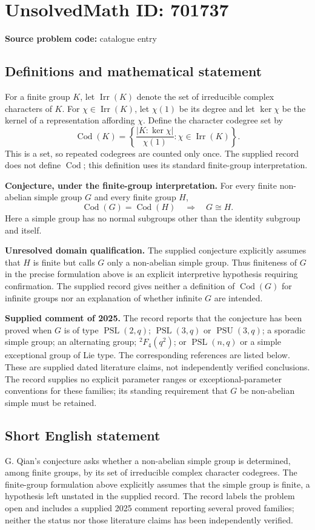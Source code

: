 \documentclass[11pt]{article}
\begin{document}
\section*{UnsolvedMath ID: 701737}
\textbf{Source problem code:} catalogue entry
\subsection{Definitions and mathematical statement}
For a finite group \(K\), let \(\operatorname{Irr}(K)\) denote the set of irreducible complex characters of \(K\). For \(\chi\in\operatorname{Irr}(K)\), let \(\chi(1)\) be its degree and let \(\ker\chi\) be the kernel of a representation affording \(\chi\). Define the character codegree set by
\[
\operatorname{Cod}(K)=\left\{\frac{|K:\ker\chi|}{\chi(1)}:\chi\in\operatorname{Irr}(K)\right\}.
\]
This is a set, so repeated codegrees are counted only once. The supplied record does not define \(\operatorname{Cod}\); this definition uses its standard finite-group interpretation.

\textbf{Conjecture, under the finite-group interpretation.} For every finite non-abelian simple group \(G\) and every finite group \(H\),
\[
\operatorname{Cod}(G)=\operatorname{Cod}(H)\quad\Longrightarrow\quad G\cong H.
\]
Here a simple group has no normal subgroups other than the identity subgroup and itself.

\textbf{Unresolved domain qualification.} The supplied conjecture explicitly assumes that \(H\) is finite but calls \(G\) only a non-abelian simple group. Thus finiteness of \(G\) in the precise formulation above is an explicit interpretive hypothesis requiring confirmation. The supplied record gives neither a definition of \(\operatorname{Cod}(G)\) for infinite groups nor an explanation of whether infinite \(G\) are intended.

\textbf{Supplied comment of 2025.} The record reports that the conjecture has been proved when \(G\) is of type \(\operatorname{PSL}(2,q)\); \(\operatorname{PSL}(3,q)\) or \(\operatorname{PSU}(3,q)\); a sporadic simple group; an alternating group; \({}^{2}F_4(q^2)\); or \(\operatorname{PSL}(n,q)\) or a simple exceptional group of Lie type. The corresponding references are listed below. These are supplied dated literature claims, not independently verified conclusions. The record supplies no explicit parameter ranges or exceptional-parameter conventions for these families; its standing requirement that \(G\) be non-abelian simple must be retained.
\subsection{Short English statement}
G. Qian's conjecture asks whether a non-abelian simple group is determined, among finite groups, by its set of irreducible complex character codegrees. The finite-group formulation above explicitly assumes that the simple group is finite, a hypothesis left unstated in the supplied record. The record labels the problem open and includes a supplied 2025 comment reporting several proved families; neither the status nor those literature claims has been independently verified.
\end{document}

